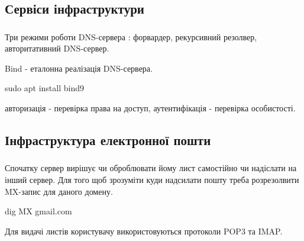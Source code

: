 \documentclass[t]{beamer}  %
\begin{document}
\subsection{Сервіси інфраструктури}

\begin{frame}
 	\frametitle{\insertsection} 
 	\framesubtitle{\insertsubsection}
Три режими роботи DNS-сервера : форвардер, рекурсивний резолвер, авторитативний DNS-сервер. 

Bind - еталонна реалізація DNS-сервера.

sudo apt install bind9

авторизація - перевірка права на доступ, аутентифікація - перевірка особистості.
\end{frame}

\subsection{Інфраструктура електронної пошти}

\begin{frame}
 	\frametitle{\insertsection} 
 	\framesubtitle{\insertsubsection}

Спочатку сервер вирішує чи оброблювати йому лист самостійно чи надіслати на інший сервер. Для того щоб зрозуміти куди надсилати пошту треба розрезолвити MX-запис для даного домену.

dig MX gmail.com

Для видачі листів користувачу використовуються протоколи POP3 та IMAP.
\end{frame}
\end{document}
